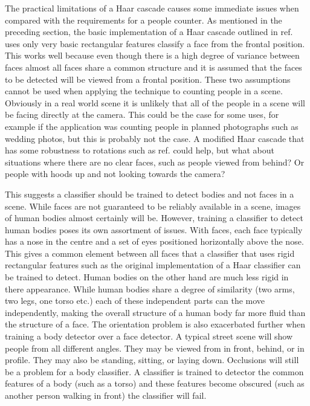\documentclass[conference]{IEEEtran}
\begin{document}
The practical limitations of a Haar cascade causes some immediate issues when compared with the requirements for a people counter. As mentioned in the preceding section, the basic implementation of a Haar cascade outlined in ref. \cite{viola2004robust} uses only very basic rectangular features classify a face from the frontal position. This works well because even though there is a high degree of variance between faces almost all faces share a common structure and it is assumed that the faces to be detected will be viewed from a frontal position. These two assumptions cannot be used when applying the technique to counting people in a scene. Obviously in a real world scene it is unlikely that all of the people in a scene will be facing directly at the camera. This could be the case for some uses, for example if the application was counting people in planned photographs such as wedding photos, but this is probably not the case. A modified Haar cascade that has some robustness to rotations such as ref. \cite{jones2003fast} could help, but what about situations where there are no clear faces, such as people viewed from behind? Or people with hoods up and not looking towards the camera?

This suggests a classifier should be trained to detect bodies and not faces in a scene. While faces are not guaranteed to be reliably available in a scene, images of human bodies almost certainly will be. However, training a classifier to detect human bodies poses its own assortment of issues. With faces, each face typically has a nose in the centre and a set of eyes positioned horizontally above the nose. This gives a common element between all faces that a classifier that uses rigid rectangular features such as the original implementation of a Haar classifier can be trained to detect. Human bodies on the other hand are much less rigid in there appearance. While human bodies share a degree of similarity (two arms, two legs, one torso etc.) each of these independent parts can the move independently, making the overall structure of a human body far more fluid than the structure of a face. The orientation problem is also exacerbated further when training a body detector over a face detector. A typical street scene will show people from all different angles. They may be viewed from in front, behind, or in profile. They may also be standing, sitting, or laying down. Occlusions will still be a problem for a body classifier. A classifier is trained to detector the common features of a body (such as a torso) and these features become obscured (such as another person walking in front) the classifier will fail.
\end{document}

